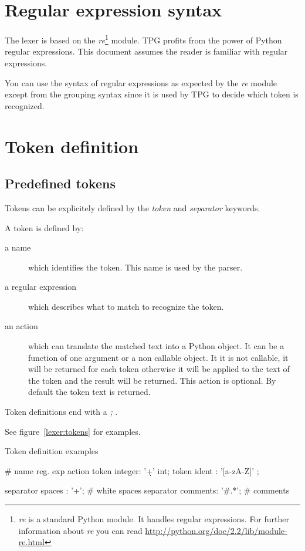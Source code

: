 \section{Regular expression syntax}

The lexer is based on the \emph{re}\footnote{\emph{re} is a standard Python module. It handles regular expressions. For further information about \emph{re} you can read \url{http://python.org/doc/2.2/lib/module-re.html}} module.
TPG profits from the power of Python regular expressions.
This document assumes the reader is familiar with regular expressions.

You can use the syntax of regular expressions as expected by the \emph{re} module except from the grouping syntax since it is used by TPG to decide which token is recognized.

\section{Token definition}									\label{lexer:token_def}

\subsection{Predefined tokens}

Tokens can be explicitely defined by the \emph{token} and \emph{separator} keywords.

A token is defined by:

\begin{description}
	\item [a name] which identifies the token.
		This name is used by the parser.
	\item [a regular expression] which describes what to match to recognize the token.
	\item [an action] which can translate the matched text into a Python object. It can be a function of one argument or a non callable object. It it is not callable, it will be returned for each token otherwise it will be applied to the text of the token and the result will be returned. This action is optional. By default the token text is returned.
\end{description}

Token definitions end with a \emph{;} .

See figure~\ref{lexer:tokens} for examples.

\begin{code}
\caption{Token definition examples}							\label{lexer:tokens}
\begin{verbatimtab}[4]
	#     name     reg. exp        action
	token integer: '\d+'           int;
	token ident  : '[a-zA-Z]\w*'   ;

	separator spaces  : '\s+';     # white spaces
	separator comments: '#.*';     # comments
\end{verbatimtab}
\end{code}

